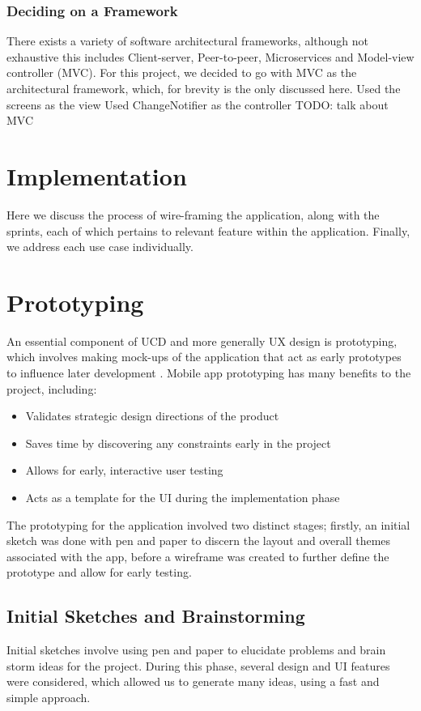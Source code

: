 \documentclass[12pt]{article}
\begin{document}
	\subsubsection{Deciding on a Framework}
	There exists a variety of software architectural frameworks, although not exhaustive this includes Client-server, Peer-to-peer, Microservices and Model-view controller (MVC). For this project, we decided to go with MVC as the architectural framework, which, for brevity is the only discussed here.
	Used the screens as the view
	Used ChangeNotifier as the controller
	TODO: talk about MVC
	
	\section{Implementation}
	\label{chap:implementation}
	Here we discuss the process of wire-framing the application, along with the sprints, each of which pertains to relevant feature within the application. Finally, we address each use case individually.
	
	\section{Prototyping}
	An essential component of UCD and more generally UX design is prototyping, which involves making mock-ups of the application that act as early prototypes to influence later development \cite{arnowitzChapter15Wireframe2007}. Mobile app prototyping has many benefits to the project, including:
	\begin{itemize}
		\item Validates strategic design directions of the product
		\item Saves time by discovering any constraints early in the project
		\item Allows for early, interactive user testing
		\item Acts as a template for the UI during the implementation phase
	\end{itemize}
	 
	
	The prototyping for the application involved two distinct stages; firstly, an initial sketch was done with pen and paper to discern the layout and overall themes associated with the app, before a wireframe was created to further define the prototype and allow for early testing.
	
	\subsection{Initial Sketches and Brainstorming}
	Initial sketches involve using pen and paper to elucidate problems and brain storm ideas for the project. During this phase, several design and UI features were considered, which allowed us to generate many ideas, using a fast and simple approach.
	
\end{document}
